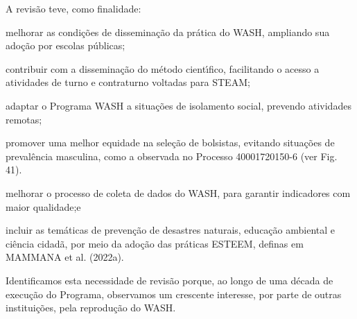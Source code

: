 \documentclass[
12pt,		%
openright,	%
twoside,  %
a4paper,			%
chapter=TITLE,		%
english,			%
french,				%
spanish,			%
brazil				%
]{USPSC-classe/USPSC}
\begin{document}
A revis\~ao teve, como finalidade:


















\begin{alineas}
\item melhorar as condi\c{c}\~oes de dissemina\c{c}\~ao da pr\'atica do WASH, ampliando sua ado\c{c}\~ao por escolas p\'ublicas;
\item contribuir com a dissemina\c{c}\~ao do m\'etodo cient\'{\i}fico, facilitando o acesso a atividades de turno e contraturno voltadas para STEAM;
\item adaptar o Programa WASH a situa\c{c}\~oes de isolamento social, prevendo atividades remotas;
\item promover uma melhor equidade na sele\c{c}\~ao de bolsistas, evitando situa\c{c}\~oes de preval\^encia masculina, como a observada no Processo 40001720150-6 (ver Fig. 41).
\item melhorar o processo de coleta de dados do WASH, para garantir indicadores com maior qualidade;e
\item incluir as tem\'aticas de preven\c{c}\~ao de desastres naturais, educa\c{c}\~ao ambiental e ci\^encia cidad\~a, por meio da ado\c{c}\~ao das pr\'aticas ESTEEM, definas em  MAMMANA et al. (2022a).
\end{alineas}

Identificamos esta necessidade de revis\~ao porque, ao longo de uma d\'ecada de execu\c{c}\~ao do Programa, observamos um crescente interesse, por parte de outras institui\c{c}\~oes, pela reprodu\c{c}\~ao do WASH.
\end{document}
